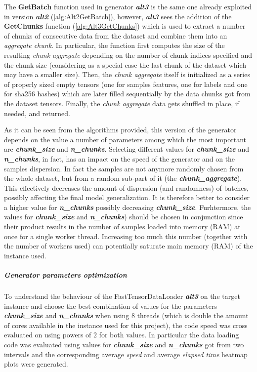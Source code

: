 \documentclass[pdfa%
,cucitura%
]{toptesi}
\begin{document}
The \textbf{GetBatch} function used in generator \textit{\textbf{alt3}} is the same one already exploited in version \textit{\textbf{alt2}} (\ref{alg:Alt2GetBatch}), however, \textit{\textbf{alt3}} sees the addition of the \textbf{GetChunks} function (\ref{alg:Alt3GetChunks}) which is used to extract a number of chunks of consecutive data from the dataset and combine them into an \textit{aggregate chunk}. In particular, the function first computes the size of the resulting \textit{chunk aggregate} depending on the number of chunk indices specified and the chunk size (considering as a special case the last chunk of the dataset which may have a smaller size). Then, the \textit{chunk aggregate} itself is initialized as a series of properly sized empty tensors (one for samples features, one for labels and one for sha256 hashes) which are later filled sequentially by the data chunks got from the dataset tensors. Finally, the \textit{chunk aggregate} data gets shuffled in place, if needed, and returned.

As it can be seen from the algorithms provided, this version of the generator depends on the value a number of parameters among which the most important are \textit{\textbf{chunk\_size}} and \textit{\textbf{n\_chunks}}. Selecting different values for \textit{\textbf{chunk\_size}} and \textit{\textbf{n\_chunks}}, in fact, has an impact on the speed of the generator and on the samples dispersion. In fact the samples are not anymore randomly chosen from the whole dataset, but from a random sub-part of it (the \textit{\textbf{chunk\_aggregate}}). This effectively decreases the amount of dispersion (and randomness) of batches, possibly affecting the final model generalization. It is therefore better to consider a higher value for \textit{\textbf{n\_chunks}} possibly decreasing \textit{\textbf{chunk\_size}}. Furhtermore, the values for \textit{\textbf{chunk\_size}} and \textit{\textbf{n\_chunks}}) should be chosen in conjunction since their product results in the number of samples loaded into memory (RAM) at once for a single worker thread. Increasing too much this number (together with the number of workers used) can potentially saturate main memory (RAM) of the instance used.

\subparagraph{Generator parameters optimization}
To understand the behaviour of the FastTensorDataLoader \textit{\textbf{alt3}} on the target instance and choose the best combination of values for the parameters \textit{\textbf{chunk\_size}} and \textit{\textbf{n\_chunks}} when using 8 threads (which is double the amount of cores available in the instance used for this project), the code speed was cross evaluated on using powers of 2 for both values. In particular the data loading code was evaluated using values for \textit{\textbf{chunk\_size}} and \textit{\textbf{n\_chunks}} got from two intervals and the corresponding average \textit{speed} and average \textit{elapsed time} heatmap plots were generated.
\end{document}
